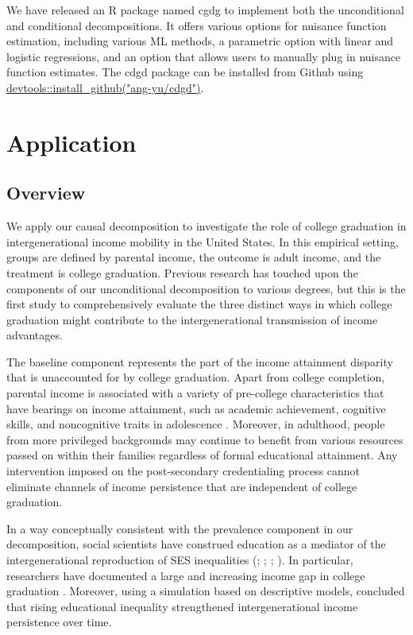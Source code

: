 \documentclass[12pt,a4paper]{article}
\begin{document}
We have released an R package named cgdg to implement both the unconditional and conditional decompositions. It offers various options for nuisance function estimation, including various ML methods, a parametric option with linear and logistic regressions, and an option that allows users to manually plug in nuisance function estimates. The cdgd package can be installed from Github using \url{devtools::install_github("ang-yu/cdgd")}.


\section{Application}
\subsection{Overview}
We apply our causal decomposition to investigate the role of college graduation in intergenerational income mobility in the United States. In this empirical setting, groups are defined by parental income, the outcome  is adult income, and the treatment is college graduation. 
Previous research has touched upon the components of our unconditional decomposition to various degrees, but this is the first study to comprehensively evaluate the three distinct ways in which college graduation might contribute to the intergenerational transmission of income advantages. 

The baseline component represents the part of the income attainment disparity that is unaccounted for by college graduation. Apart from college completion, parental income is associated with a variety of pre-college characteristics that have bearings on income attainment, such as academic achievement, cognitive skills, and noncognitive traits in adolescence \citep{reardon_widening_2011, heckman_effects_2006, farkas_cognitive_2003}. Moreover, in adulthood, people from more privileged backgrounds may continue to benefit from various resources passed on within their families regardless of formal educational attainment. Any intervention imposed on the post-secondary credentialing process cannot eliminate channels of income persistence that are independent of college graduation. 

In a way conceptually consistent with the prevalence component in our decomposition, social scientists have construed education as a mediator of the intergenerational reproduction of SES inequalities (\citealp[chapter 4 \& 5]{blau_american_1978}; \citealp[p.255-9]{featherman_opportunity_1978}; \citealp{ishida_class_1995}; \citealp{breen_educational_2010}). In particular, researchers have documented a large and increasing income gap in college graduation \citep{ziol-guest_parent_2016, bailey_gains_2011}. Moreover, using a simulation based on descriptive models, \citet{bloome_educational_2018} concluded that rising educational inequality strengthened intergenerational income persistence over time. 
\end{document}
